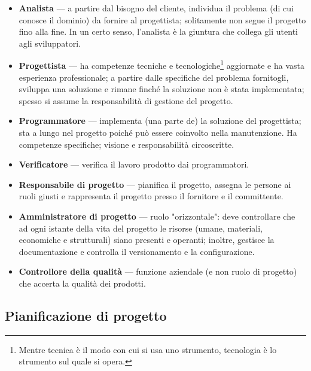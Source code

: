 \documentclass[a4paper]{article}
\begin{document}
	\begin{itemize}
		
			
	\item \textbf{Analista} --- a partire dal bisogno del cliente, individua il problema (di cui conosce il dominio) da fornire al progettista; solitamente non segue il progetto fino alla fine. In un certo senso, l'analista è la giuntura che collega gli utenti agli sviluppatori.
			
	\item \textbf{Progettista} --- ha competenze tecniche e tecnologiche\footnote{Mentre tecnica è il modo con cui si usa uno strumento, tecnologia è lo strumento sul quale si opera.} aggiornate e ha vasta esperienza professionale; a partire dalle specifiche del problema fornitogli, sviluppa una soluzione e rimane finché la soluzione non è stata implementata; spesso si assume la responsabilità di gestione del progetto.
			
	\item \textbf{Programmatore} --- implementa (una parte de) la soluzione del progettista; sta a lungo nel progetto poiché può essere coinvolto nella manutenzione. Ha competenze specifiche; visione e responsabilità circoscritte.
			
	\item \textbf{Verificatore} --- verifica il lavoro prodotto dai programmatori.
			
	\item \textbf{Responsabile di progetto} --- pianifica il progetto, assegna le persone ai ruoli giusti e rappresenta il progetto presso il fornitore e il committente.
			
	\item \textbf{Amministratore di progetto} --- ruolo "orizzontale": deve controllare che ad ogni istante della vita del progetto le risorse (umane, materiali, economiche e strutturali) siano presenti e operanti; inoltre, gestisce la documentazione e controlla il versionamento e la configurazione.
			
	\item \textbf{Controllore della qualità} --- funzione aziendale (e non ruolo di progetto) che accerta la qualità dei prodotti.
		
	\end{itemize}


		
	\subsection{Pianificazione di progetto}
\end{document}
